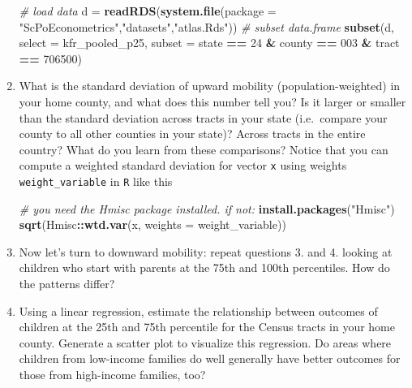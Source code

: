 \documentclass[]{book}
\newenvironment{Shaded}{\begin{snugshade}}{\end{snugshade}}
\newcommand{\KeywordTok}[1]{\textcolor[rgb]{0.13,0.29,0.53}{\textbf{#1}}}
\newcommand{\DataTypeTok}[1]{\textcolor[rgb]{0.13,0.29,0.53}{#1}}
\newcommand{\DecValTok}[1]{\textcolor[rgb]{0.00,0.00,0.81}{#1}}
\newcommand{\StringTok}[1]{\textcolor[rgb]{0.31,0.60,0.02}{#1}}
\newcommand{\CommentTok}[1]{\textcolor[rgb]{0.56,0.35,0.01}{\textit{#1}}}
\newcommand{\OperatorTok}[1]{\textcolor[rgb]{0.81,0.36,0.00}{\textbf{#1}}}
\newcommand{\NormalTok}[1]{#1}
\begin{document}
\begin{enumerate}
\begin{Shaded}
\begin{Highlighting}[]
\CommentTok{# load data}
\NormalTok{d =}\StringTok{ }\KeywordTok{readRDS}\NormalTok{(}\KeywordTok{system.file}\NormalTok{(}\DataTypeTok{package =} \StringTok{"ScPoEconometrics"}\NormalTok{,}\StringTok{"datasets"}\NormalTok{,}\StringTok{"atlas.Rds"}\NormalTok{))}
\CommentTok{# subset data.frame}
\KeywordTok{subset}\NormalTok{(d, }\DataTypeTok{select =}\NormalTok{ kfr_pooled_p25, }\DataTypeTok{subset =}\NormalTok{ state }\OperatorTok{==}\StringTok{ }\DecValTok{24} \OperatorTok{&}\StringTok{ }\NormalTok{county }\OperatorTok{==}\StringTok{ }\DecValTok{003} \OperatorTok{&}\StringTok{ }\NormalTok{tract }\OperatorTok{==}\StringTok{ }\DecValTok{706500}\NormalTok{)}
\end{Highlighting}
\end{Shaded}
\item
  What is the standard deviation of upward mobility
  (population-weighted) in your home county, and what does this number
  tell you? Is it larger or smaller than the standard deviation across
  tracts in your state (i.e.~compare your county to all other counties
  in your state)? Across tracts in the entire country? What do you learn
  from these comparisons? Notice that you can compute a weighted
  standard deviation for vector \texttt{x} using weights
  \texttt{weight\_variable} in \texttt{R} like this

\begin{Shaded}
\begin{Highlighting}[]
\CommentTok{# you need the Hmisc package installed. if not:}
\KeywordTok{install.packages}\NormalTok{(}\StringTok{"Hmisc"}\NormalTok{)}
\KeywordTok{sqrt}\NormalTok{(Hmisc}\OperatorTok{::}\KeywordTok{wtd.var}\NormalTok{(x, }\DataTypeTok{weights =}\NormalTok{ weight_variable))}
\end{Highlighting}
\end{Shaded}
\item
  Now let's turn to downward mobility: repeat questions 3. and 4.
  looking at children who start with parents at the 75th and 100th
  percentiles. How do the patterns differ?
\item
  Using a linear regression, estimate the relationship between outcomes
  of children at the 25th and 75th percentile for the Census tracts in
  your home county. Generate a scatter plot to visualize this
  regression. Do areas where children from low-income families do well
  generally have better outcomes for those from high-income families,
  too?


\end{enumerate}
\end{document}
